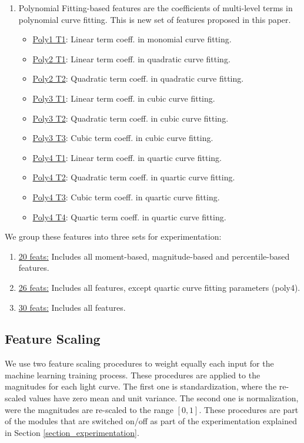 \documentclass[a4paper,fleqn,usenatbib]{mnras}
\begin{document}
\begin{enumerate}
  \item Polynomial Fitting-based features are the coefficients of
    multi-level terms in polynomial curve fitting. This is new set
    of features proposed in this paper. 
    \begin{itemize}
        \item \underline{Poly1 T1}: Linear term coeff. in monomial curve fitting.
        \item \underline{Poly2 T1}: Linear term coeff. in quadratic curve fitting.
        \item \underline{Poly2 T2}: Quadratic term coeff. in quadratic curve fitting.
        \item \underline{Poly3 T1}: Linear term coeff. in cubic curve fitting.
        \item \underline{Poly3 T2}: Quadratic term coeff. in cubic curve fitting.
        \item \underline{Poly3 T3}: Cubic term coeff. in cubic curve fitting.
        \item \underline{Poly4 T1}: Linear term coeff. in quartic curve fitting.
        \item \underline{Poly4 T2}: Quadratic term coeff. in quartic curve fitting.
        \item \underline{Poly4 T3}: Cubic term coeff. in quartic curve fitting.
        \item \underline{Poly4 T4}: Quartic term coeff. in quartic curve fitting.
    \end{itemize}    
\end{enumerate}

We group these features into three sets for experimentation:

\begin{enumerate}
\item \underline{20 feats:} Includes all moment-based, magnitude-based
  and percentile-based features.  
\item \underline{26 feats:} Includes all features, except quartic
  curve fitting parameters (poly4). 
\item \underline{30 feats:} Includes all features.
\end{enumerate}


\subsection{Feature Scaling} \label{subsection_scaling}

We use two feature scaling procedures to weight equally each input
for the machine learning training process.
These procedures are applied to the magnitudes for each light curve.
The first one is standardization, where the re-scaled values have zero mean 
and unit variance. 
The second one is normalization, were the magnitudes are re-scaled  to the
range $[0,1]$. 
These procedures are part of the modules that are switched on/off as
part of the experimentation explained in Section \ref{section_experimentation}.
\end{document}
